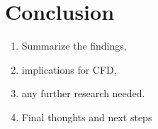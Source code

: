 \chapter{Conclusion}
\label{chap:conclusion}

\begin{enumerate}
    \item Summarize the findings, 
    \item implications for CFD, 
    \item any further research needed.
    \item Final thoughts and next steps
\end{enumerate}